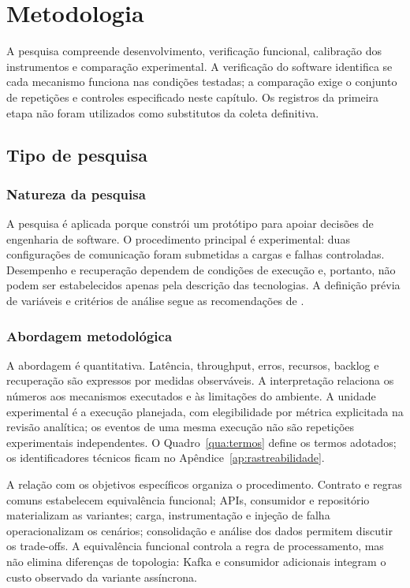 \chapter{Metodologia}
\label{cap:metodo}

A pesquisa compreende desenvolvimento, verificação funcional, calibração dos instrumentos e comparação experimental. A verificação do software identifica se cada mecanismo funciona nas condições testadas; a comparação exige o conjunto de repetições e controles especificado neste capítulo. Os registros da primeira etapa não foram utilizados como substitutos da coleta definitiva.

\section{Tipo de pesquisa}

\subsection{Natureza da pesquisa}
A pesquisa é aplicada porque constrói um protótipo para apoiar decisões de engenharia de software. O procedimento principal é experimental: duas configurações de comunicação foram submetidas a cargas e falhas controladas. Desempenho e recuperação dependem de condições de execução e, portanto, não podem ser estabelecidos apenas pela descrição das tecnologias. A definição prévia de variáveis e critérios de análise segue as recomendações de .

\subsection{Abordagem metodológica}
A abordagem é quantitativa. Latência, throughput, erros, recursos, backlog e recuperação são expressos por medidas observáveis. A interpretação relaciona os números aos mecanismos executados e às limitações do ambiente. A unidade experimental é a execução planejada, com elegibilidade por métrica explicitada na revisão analítica; os eventos de uma mesma execução não são repetições experimentais independentes. O Quadro~\ref{qua:termos} define os termos adotados; os identificadores técnicos ficam no Apêndice~\ref{ap:rastreabilidade}.



A relação com os objetivos específicos organiza o procedimento. Contrato e regras comuns estabelecem equivalência funcional; APIs, consumidor e repositório materializam as variantes; carga, instrumentação e injeção de falha operacionalizam os cenários; consolidação e análise dos dados permitem discutir os trade-offs. A equivalência funcional controla a regra de processamento, mas não elimina diferenças de topologia: Kafka e consumidor adicionais integram o custo observado da variante assíncrona.

